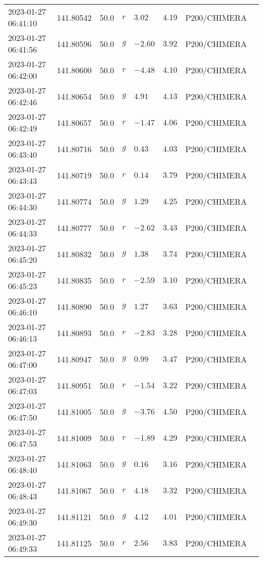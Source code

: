 \documentclass{nature_plusfigure}
\begin{document}
\begin{supplement}
\begin{center}
\begin{longtable}{llllllll}
2023-01-27 06:41:10 & 141.80542 & 50.0 & $r$ & $3.02$ & $4.19$ & P200/CHIMERA &  \\ 
2023-01-27 06:41:56 & 141.80596 & 50.0 & $g$ & $-2.60$ & $3.92$ & P200/CHIMERA &  \\ 
2023-01-27 06:42:00 & 141.80600 & 50.0 & $r$ & $-4.48$ & $4.10$ & P200/CHIMERA &  \\ 
2023-01-27 06:42:46 & 141.80654 & 50.0 & $g$ & $4.91$ & $4.13$ & P200/CHIMERA &  \\ 
2023-01-27 06:42:49 & 141.80657 & 50.0 & $r$ & $-1.47$ & $4.06$ & P200/CHIMERA &  \\ 
2023-01-27 06:43:40 & 141.80716 & 50.0 & $g$ & $0.43$ & $4.03$ & P200/CHIMERA &  \\ 
2023-01-27 06:43:43 & 141.80719 & 50.0 & $r$ & $0.14$ & $3.79$ & P200/CHIMERA &  \\ 
2023-01-27 06:44:30 & 141.80774 & 50.0 & $g$ & $1.29$ & $4.25$ & P200/CHIMERA &  \\ 
2023-01-27 06:44:33 & 141.80777 & 50.0 & $r$ & $-2.62$ & $3.43$ & P200/CHIMERA &  \\ 
2023-01-27 06:45:20 & 141.80832 & 50.0 & $g$ & $1.38$ & $3.74$ & P200/CHIMERA &  \\ 
2023-01-27 06:45:23 & 141.80835 & 50.0 & $r$ & $-2.59$ & $3.10$ & P200/CHIMERA &  \\ 
2023-01-27 06:46:10 & 141.80890 & 50.0 & $g$ & $1.27$ & $3.63$ & P200/CHIMERA &  \\ 
2023-01-27 06:46:13 & 141.80893 & 50.0 & $r$ & $-2.83$ & $3.28$ & P200/CHIMERA &  \\ 
2023-01-27 06:47:00 & 141.80947 & 50.0 & $g$ & $0.99$ & $3.47$ & P200/CHIMERA &  \\ 
2023-01-27 06:47:03 & 141.80951 & 50.0 & $r$ & $-1.54$ & $3.22$ & P200/CHIMERA &  \\ 
2023-01-27 06:47:50 & 141.81005 & 50.0 & $g$ & $-3.76$ & $4.50$ & P200/CHIMERA &  \\ 
2023-01-27 06:47:53 & 141.81009 & 50.0 & $r$ & $-1.89$ & $4.29$ & P200/CHIMERA &  \\ 
2023-01-27 06:48:40 & 141.81063 & 50.0 & $g$ & $0.16$ & $3.16$ & P200/CHIMERA &  \\ 
2023-01-27 06:48:43 & 141.81067 & 50.0 & $r$ & $4.18$ & $3.32$ & P200/CHIMERA &  \\ 
2023-01-27 06:49:30 & 141.81121 & 50.0 & $g$ & $4.12$ & $4.01$ & P200/CHIMERA &  \\ 
2023-01-27 06:49:33 & 141.81125 & 50.0 & $r$ & $2.56$ & $3.83$ & P200/CHIMERA &  \\ 

\end{longtable}
\end{center}
\end{supplement}
\end{document}
